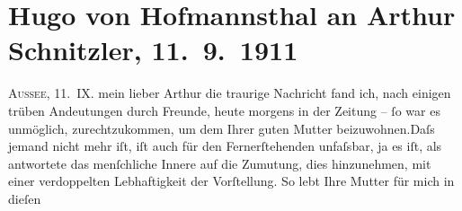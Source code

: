

         
         \renewcommand{\erwaehntePersonen}{Personen: Christiane von Hofmannsthal, Raimund von Hofmannsthal, Franz von Hofmannsthal, Hugo August von Hofmannsthal, Louise Schnitzler}
         \renewcommand{\erwaehnteOrte}{Orte: Bad Aussee, Hamburg, Kopenhagen, München, Wien}
         \renewcommand{\erwaehnteWerke}{Werke: Das weite Land. Tragikomödie in fünf Akten}
               \section[Hugo von Hofmannsthal an Arthur Schnitzler, 11. 9. 1911]{ Hugo von Hofmannsthal an Arthur Schnitzler, 11. 9. 1911}\nopagebreak{}\rehead{ }\begin{ledgroupsized}[t]{13cm}\normalsize\beginnumbering \toendnotes[C]{\smallbreak\pagebreak[2]} 
\toendnotes[C]{\smallbreak}\pstart
           \raggedleft{}{\pb}\textsc{Aussee}, 11. IX.\pend
           \pstart{}mein lieber Arthur \pend\pstart
           die traurige Nachricht fand ich, nach einigen trüben Andeutungen durch Freunde, heute
               morgens in der Zeitung – ſo war es unmöglich, zurechtzukommen, um dem \label{K_L02027_1v}\label{K_L02027_1h} Ihrer guten Mutter beizuwohnen.\hspace*{1.5em}Daſs jemand nicht mehr iſt, iſt auch für den Fernerſtehenden
               unfaſsbar, ja es iſt, als antwortete das menſchliche Innere {\pb}auf die Zumutung, dies
               hinzunehmen, mit einer verdoppelten Lebhaftigkeit der Vorſtellung. So lebt Ihre Mutter für mich in dieſen

\end{ledgroupsized}
